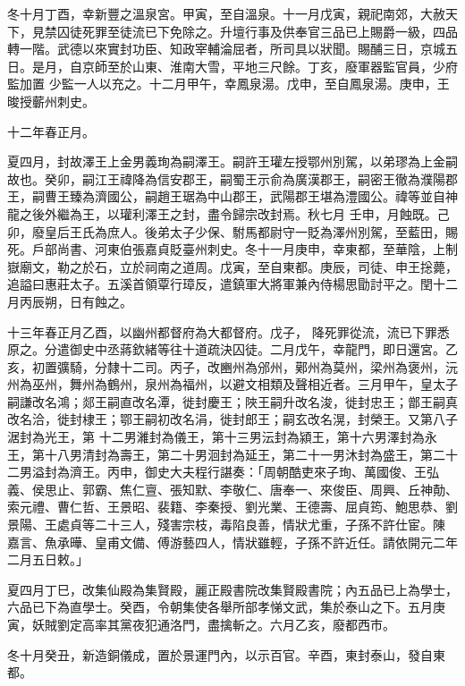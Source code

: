 \begin{pinyinscope}
 冬十月丁酉，幸新豐之溫泉宮。甲寅，至自溫泉。十一月戊寅，親祀南郊，大赦天下，見禁囚徒死罪至徒流已下免除之。升壇行事及供奉官三品已上賜爵一級，四品轉一階。武德以來實封功臣、知政宰輔淪屈者，所司具以狀聞。賜酺三日，京城五日。是月，自京師至於山東、淮南大雪，平地三尺餘。丁亥，廢軍器監官員，少府監加置
 少監一人以充之。十二月甲午，幸鳳泉湯。戊申，至自鳳泉湯。庚申，王晙授蘄州刺史。



 十二年春正月。



 夏四月，封故澤王上金男義珣為嗣澤王。嗣許王瓘左授鄂州別駕，以弟璆為上金嗣故也。癸卯，嗣江王禕降為信安郡王，嗣蜀王示俞為廣漢郡王，嗣密王徹為濮陽郡王，嗣曹王臻為濟國公，嗣趙王琚為中山郡王，武陽郡王堪為澧國公。禕等並自神龍之後外繼為王，以瓘利澤王之封，盡令歸宗改封焉。秋七月
 壬申，月蝕既。己卯，廢皇后王氏為庶人。後弟太子少保、駙馬都尉守一貶為澤州別駕，至藍田，賜死。戶部尚書、河東伯張嘉貞貶臺州刺史。冬十一月庚申，幸東都，至華陰，上制嶽廟文，勒之於石，立於祠南之道周。戊寅，至自東都。庚辰，司徒、申王捴薨，追謚曰惠莊太子。五溪首領覃行璋反，遣鎮軍大將軍兼內侍楊思勖討平之。閏十二月丙辰朔，日有蝕之。



 十三年春正月乙酉，以幽州都督府為大都督府。戊子，
 降死罪從流，流已下罪悉原之。分遣御史中丞蔣欽緒等往十道疏決囚徒。二月戊午，幸龍門，即日還宮。乙亥，初置彍騎，分隸十二司。丙子，改豳州為邠州，鄚州為莫州，梁州為褒州，沅州為巫州，舞州為鶴州，泉州為福州，以避文相類及聲相近者。三月甲午，皇太子嗣謙改名鴻；郯王嗣直改名潭，徙封慶王；陜王嗣升改名浚，徙封忠王；鄫王嗣真改名洽，徙封棣王；鄂王嗣初改名涓，徙封郎王；嗣玄改名滉，封榮王。又第八子涺封為光王，第
 十二男濰封為儀王，第十三男沄封為潁王，第十六男澤封為永王，第十八男清封為壽王，第二十男洄封為延王，第二十一男沐封為盛王，第二十二男溢封為濟王。丙申，御史大夫程行諶奏：「周朝酷吏來子珣、萬國俊、王弘義、侯思止、郭霸、焦仁亶、張知默、李敬仁、唐奉一、來俊臣、周興、丘神勣、索元禮、曹仁哲、王景昭、裴籍、李秦授、劉光業、王德壽、屈貞筠、鮑思恭、劉景陽、王處貞等二十三人，殘害宗枝，毒陷良善，情狀尤重，子孫不許仕宦。陳
 嘉言、魚承曄、皇甫文備、傅游藝四人，情狀雖輕，子孫不許近任。請依開元二年二月五日敕。」



 夏四月丁巳，改集仙殿為集賢殿，麗正殿書院改集賢殿書院；內五品已上為學士，六品已下為直學士。癸酉，令朝集使各舉所部孝悌文武，集於泰山之下。五月庚寅，妖賊劉定高率其黨夜犯通洛門，盡擒斬之。六月乙亥，廢都西市。



 冬十月癸丑，新造銅儀成，置於景運門內，以示百官。辛酉，東封泰山，發自東都。




\end{pinyinscope}
